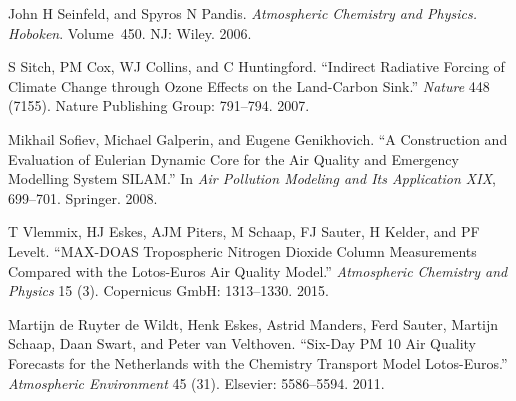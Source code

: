 \documentclass[9pt]{report}
\begin{document}
{\begin{thebibliography}{32}
John H Seinfeld, and Spyros N Pandis. \emph{Atmospheric Chemistry and Physics. Hoboken}. Volume 450. NJ: Wiley. 2006.\label{seinfeld2006atmospheric}%

S Sitch, PM Cox, WJ Collins, and C Huntingford. \textquotedblleft{}Indirect Radiative Forcing of Climate Change through Ozone Effects on the Land-Carbon Sink.\textquotedblright{} \emph{Nature} 448 (7155). Nature Publishing Group: 791–794. 2007.\label{sitch2007indirect}%

Mikhail Sofiev, Michael Galperin, and Eugene Genikhovich. \textquotedblleft{}A Construction and Evaluation of Eulerian Dynamic Core for the Air Quality and Emergency Modelling System SILAM.\textquotedblright{} In \emph{Air Pollution Modeling and Its Application XIX}, 699–701. Springer. 2008.\label{sofiev2008construction}%

T Vlemmix, HJ Eskes, AJM Piters, M Schaap, FJ Sauter, H Kelder, and PF Levelt. \textquotedblleft{}MAX-DOAS Tropospheric Nitrogen Dioxide Column Measurements Compared with the Lotos-Euros Air Quality Model.\textquotedblright{} \emph{Atmospheric Chemistry and Physics} 15 (3). Copernicus GmbH: 1313–1330. 2015.\label{vlemmix2015max}%

Martijn de Ruyter de Wildt, Henk Eskes, Astrid Manders, Ferd Sauter, Martijn Schaap, Daan Swart, and Peter van Velthoven. \textquotedblleft{}Six-Day PM 10 Air Quality Forecasts for the Netherlands with the Chemistry Transport Model Lotos-Euros.\textquotedblright{} \emph{Atmospheric Environment} 45 (31). Elsevier: 5586–5594. 2011.\label{de2011six}%
\par%
\end{thebibliography}}%
\end{document}
